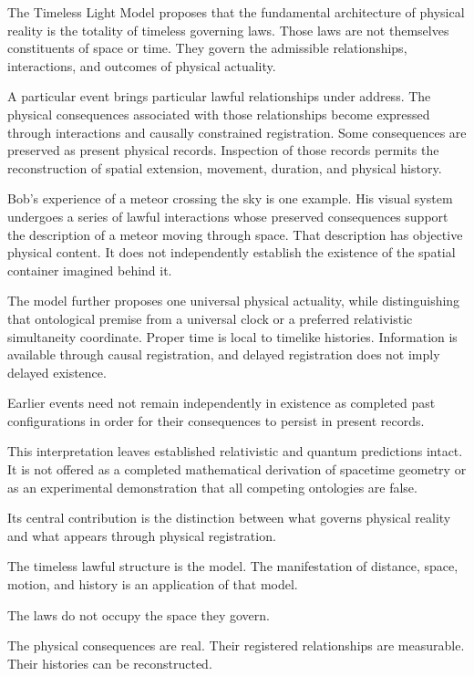 \documentclass[12pt,onecolumn]{article}
\begin{document}
The Timeless Light Model proposes that the fundamental architecture of physical reality is the totality of timeless governing laws. Those laws are not themselves constituents of space or time. They govern the admissible relationships, interactions, and outcomes of physical actuality.

A particular event brings particular lawful relationships under address. The physical consequences associated with those relationships become expressed through interactions and causally constrained registration. Some consequences are preserved as present physical records. Inspection of those records permits the reconstruction of spatial extension, movement, duration, and physical history.

Bob's experience of a meteor crossing the sky is one example. His visual system undergoes a series of lawful interactions whose preserved consequences support the description of a meteor moving through space. That description has objective physical content. It does not independently establish the existence of the spatial container imagined behind it.

The model further proposes one universal physical actuality, while distinguishing that ontological premise from a universal clock or a preferred relativistic simultaneity coordinate. Proper time is local to timelike histories. Information is available through causal registration, and delayed registration does not imply delayed existence.

Earlier events need not remain independently in existence as completed past configurations in order for their consequences to persist in present records.

This interpretation leaves established relativistic and quantum predictions intact. It is not offered as a completed mathematical derivation of spacetime geometry or as an experimental demonstration that all competing ontologies are false.

Its central contribution is the distinction between what governs physical reality and what appears through physical registration.

The timeless lawful structure is the model. The manifestation of distance, space, motion, and history is an application of that model.

The laws do not occupy the space they govern.

The physical consequences are real. Their registered relationships are measurable. Their histories can be reconstructed.
\end{document}
